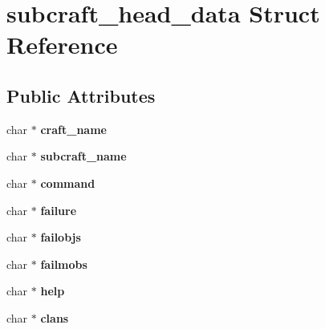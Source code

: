 \hypertarget{structsubcraft__head__data}{\section{subcraft\-\_\-head\-\_\-data Struct Reference}
\label{structsubcraft__head__data}
}
\subsection*{Public Attributes}
\begin{DoxyCompactItemize}
\item 
\hypertarget{structsubcraft__head__data_a3fbb279248041651dd873c7c7265a36b}{char $\ast$ {\bfseries craft\-\_\-name}}\label{structsubcraft__head__data_a3fbb279248041651dd873c7c7265a36b}

\item 
\hypertarget{structsubcraft__head__data_a011bfa753e34f34f50f725cdb16601a8}{char $\ast$ {\bfseries subcraft\-\_\-name}}\label{structsubcraft__head__data_a011bfa753e34f34f50f725cdb16601a8}

\item 
\hypertarget{structsubcraft__head__data_a7bfeebd0a550e80e15c46cfd4b6548d9}{char $\ast$ {\bfseries command}}\label{structsubcraft__head__data_a7bfeebd0a550e80e15c46cfd4b6548d9}

\item 
\hypertarget{structsubcraft__head__data_a5686d182f49445e674c7d24db72df3c0}{char $\ast$ {\bfseries failure}}\label{structsubcraft__head__data_a5686d182f49445e674c7d24db72df3c0}

\item 
\hypertarget{structsubcraft__head__data_a325350eb5d9bfb322c3e306ef9a858f0}{char $\ast$ {\bfseries failobjs}}\label{structsubcraft__head__data_a325350eb5d9bfb322c3e306ef9a858f0}

\item 
\hypertarget{structsubcraft__head__data_a67698fc5060906c45979b28bac24a0cf}{char $\ast$ {\bfseries failmobs}}\label{structsubcraft__head__data_a67698fc5060906c45979b28bac24a0cf}

\item 
\hypertarget{structsubcraft__head__data_a71a8c68691ee6c65a645f3fafc8b5b8a}{char $\ast$ {\bfseries help}}\label{structsubcraft__head__data_a71a8c68691ee6c65a645f3fafc8b5b8a}

\item 
\hypertarget{structsubcraft__head__data_a1825e41c58bf7d3eb3d0f84f6f439c35}{char $\ast$ {\bfseries clans}}\label{structsubcraft__head__data_a1825e41c58bf7d3eb3d0f84f6f439c35}


\end{DoxyCompactItemize}
